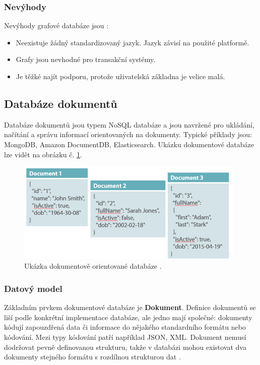 \subsubsection{Nevýhody}
Nevýhody grafové databáze jsou \cite{advantages_graph}:
\begin{itemize}
\item Neexistuje žádný standardizovaný jazyk. Jazyk závisí na použité platformě.
\item Grafy jsou nevhodné pro transakční systémy.
\item Je těžké najít podporu, protože uživatelská základna je velice malá.
\end{itemize}

\subsection{Databáze dokumentů}
Databáze dokumentů jsou typem NoSQL databáze a  jsou navržené pro ukládání, načítání a správu informací orientovaných na dokumenty. Typické příklady jsou: MongoDB, Amazon DocumentDB, Elasticsearch. Ukázku dokumentové databáze lze vidět na obrázku č. \ref{fig:db_img_document}.
	\begin{figure}[H]
	\centering
	\includegraphics[width=11cm]{img/databaze/document_db}
	\caption{Ukázka dokumentově orientované databáze \cite{relat_vs_nosql}.}
	\label{fig:db_img_document}
	\end{figure}
\subsubsection{Datový model}
Základním prvkem dokumentové databáze je \textbf{Dokument}. Definice dokumentů se liší podle konkrétní implementace databáze, ale jedno mají společné: dokumenty kódují zapouzdřená data či informace do nějakého standardního formátu nebo kódování. Mezi typy kódování patří například \gls{JSON}, \gls{XML}. Dokument nemusí dodržovat pevně definovanou strukturu, takže v databázi mohou existovat dva dokumenty stejného formátu s rozdílnou strukturou dat \cite{data_model_document}.

